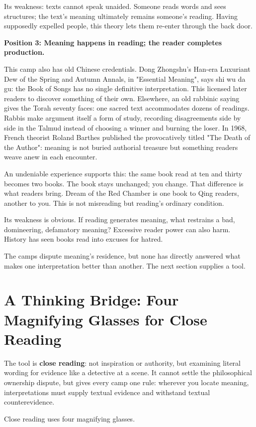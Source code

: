 Its weakness: texts cannot speak unaided. Someone reads words and sees structures; the text's meaning ultimately remains someone's reading. Having supposedly expelled people, this theory lets them re-enter through the back door.

\textbf{Position 3: Meaning happens in reading; the reader completes production.}

This camp also has old Chinese credentials. Dong Zhongshu's Han-era Luxuriant Dew of the Spring and Autumn Annals, in "Essential Meaning", says shi wu da gu: the Book of Songs has no single definitive interpretation. This licensed later readers to discover something of their own. Elsewhere, an old rabbinic saying gives the Torah seventy faces: one sacred text accommodates dozens of readings. Rabbis make argument itself a form of study, recording disagreements side by side in the Talmud instead of choosing a winner and burning the loser. In 1968, French theorist Roland Barthes published the provocatively titled "The Death of the Author": meaning is not buried authorial treasure but something readers weave anew in each encounter.

An undeniable experience supports this: the same book read at ten and thirty becomes two books. The book stays unchanged; you change. That difference is what readers bring. Dream of the Red Chamber is one book to Qing readers, another to you. This is not misreading but reading's ordinary condition.

Its weakness is obvious. If reading generates meaning, what restrains a bad, domineering, defamatory meaning? Excessive reader power can also harm. History has seen books read into excuses for hatred.

The camps dispute meaning's residence, but none has directly answered what makes one interpretation better than another. The next section supplies a tool.

\section[Thinking Bridge: Close Reading]{A Thinking Bridge: Four Magnifying Glasses for Close Reading}
The tool is \textbf{close reading}: not inspiration or authority, but examining literal wording for evidence like a detective at a scene. It cannot settle the philosophical ownership dispute, but gives every camp one rule: wherever you locate meaning, interpretations must supply textual evidence and withstand textual counterevidence.

Close reading uses four magnifying glasses.

